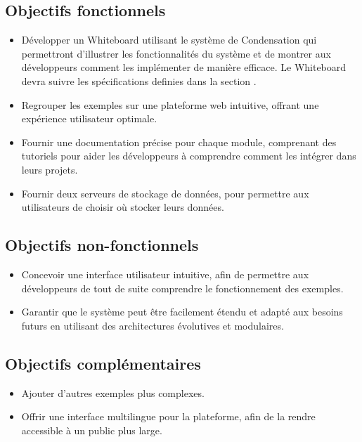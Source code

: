 \subsection*{Objectifs \guillemotleft fonctionnels\guillemotright}

\begin{itemize}
    \item Développer un Whiteboard utilisant le système de Condensation qui permettront d'illustrer les fonctionnalités du système et de montrer aux développeurs comment les implémenter de manière efficace. Le Whiteboard devra suivre les spécifications definies dans la section .
    \item Regrouper les exemples sur une plateforme web intuitive, offrant une expérience utilisateur optimale.
    \item Fournir une documentation précise pour chaque module, comprenant des tutoriels pour aider les développeurs à comprendre comment les intégrer dans leurs projets.
    \item Fournir deux serveurs de stockage de données, pour permettre aux utilisateurs de choisir où stocker leurs données.
\end{itemize}

\subsection*{Objectifs \guillemotleft non-fonctionnels\guillemotright}

\begin{itemize}
    \item Concevoir une interface utilisateur intuitive, afin de permettre aux développeurs de tout de suite comprendre le fonctionnement des exemples.
    \item Garantir que le système peut être facilement étendu et adapté aux besoins futurs en utilisant des architectures évolutives et modulaires.
\end{itemize}

\subsection*{Objectifs \guillemotleft complémentaires\guillemotright}

\begin{itemize}
    \item Ajouter d'autres exemples plus complexes.
    \item Offrir une interface multilingue pour la plateforme, afin de la rendre accessible à un public plus large.
\end{itemize}

